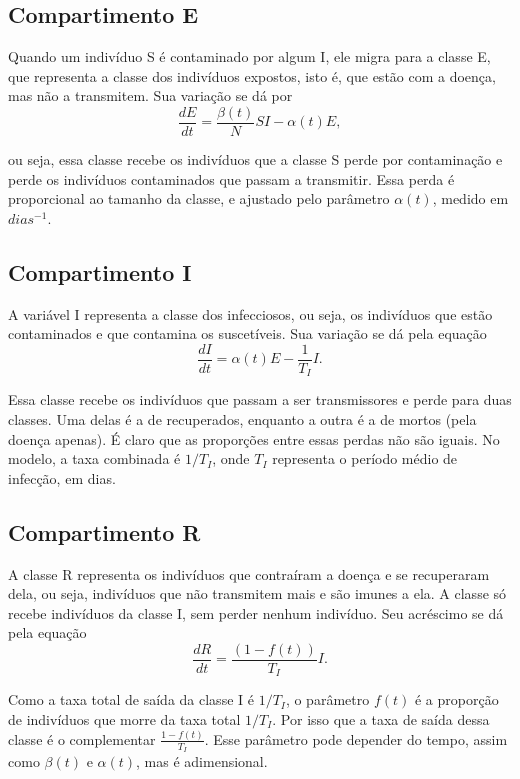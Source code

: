 \documentclass{article}
\begin{document}
\subsection{Compartimento E}

Quando um indivíduo S é contaminado por algum I, ele migra para a classe E, que representa a classe dos indivíduos expostos, isto é, que estão com a doença, mas não a transmitem. Sua variação se dá por
\[\dfrac{dE}{dt} = \dfrac{\beta(t)}{N}SI - \alpha(t) E,\]

\noindent ou seja, essa classe recebe os indivíduos que a classe S perde por contaminação e perde os indivíduos contaminados que passam a transmitir. Essa perda é proporcional ao tamanho da classe, e ajustado pelo parâmetro $\alpha(t)$, medido em $dias^{-1}$.

\subsection{Compartimento I}

A variável I representa a classe dos infecciosos, ou seja, os indivíduos que estão contaminados e que contamina os suscetíveis. Sua variação se dá pela equação
\[\dfrac{dI}{dt} = \alpha(t) E - \dfrac{1}{T_I}I.\]

Essa classe recebe os indivíduos que passam a ser transmissores e perde para duas classes. Uma delas é a de recuperados, enquanto a outra é a de mortos (pela doença apenas). É claro que as proporções entre essas perdas não são iguais. No modelo, a taxa combinada é $1/T_I$, onde $T_I$ representa o período médio de infecção, em dias.

\subsection{Compartimento R}

A classe R representa os indivíduos que contraíram a doença e se recuperaram dela, ou seja, indivíduos que não transmitem mais e são imunes a ela. A classe só recebe indivíduos da classe I, sem perder nenhum indivíduo. Seu acréscimo se dá pela equação
\[\dfrac{dR}{dt} = \dfrac{(1 - f(t))}{T_I}I.\]

Como a taxa total de saída da classe I é $1/T_I$, o parâmetro $f(t)$ é a proporção de indivíduos que morre da taxa total $1/T_I$. Por isso que a taxa de saída dessa classe é o complementar $\frac{1 - f(t)}{T_I}$. Esse parâmetro pode depender do tempo, assim como $\beta(t)$ e $\alpha(t)$, mas é adimensional.
\end{document}
